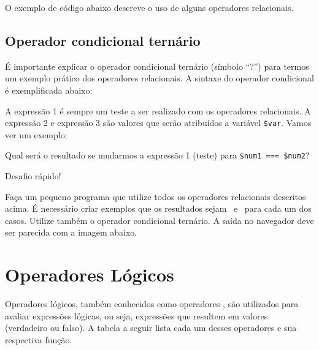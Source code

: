 

O exemplo de código abaixo descreve o uso de alguns operadores relacionais.



\subsection{Operador condicional ternário}
\label{operador-condicional-ternario}

É importante explicar o operador condicional ternário (símbolo ``?'') para termos um exemplo 
prático dos operadores relacionais. A sintaxe do operador condicional é exemplificada abaixo:



A expressão 1 é sempre um teste a ser realizado com os operadores relacionais. A expressão
2 e expressão 3 são valores que serão atribuídos a variável \texttt{\$var}. Vamos ver um exemplo:



Qual será o resultado se mudarmos a expressão 1 (teste) para \texttt{\$num1 === \$num2}?

{\Large Desafio rápido!}

Faça um pequeno programa que utilize todos os operadores relacionais descritos acima.
É necessário criar exemplos que os resultados sejam \true~e \false~para cada
um dos casos. Utilize também o operador condicional ternário. A saída no navegador
deve ser parecida com a imagem abaixo.


\section{Operadores Lógicos}
\label{operadores-logicos}

Operadores lógicos, também conhecidos como operadores \booleanos, são utilizados para
avaliar expressões lógicas, ou seja, expressões que resultem em valores \booleanos~
(verdadeiro ou falso). A tabela a seguir lista cada um desses operadores e sua respectiva
função.



